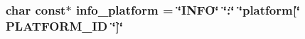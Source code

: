 \subsubsection[{\texorpdfstring{info\+\_\+platform}{info_platform}}]{\setlength{\rightskip}{0pt plus 5cm}char const$\ast$ info\+\_\+platform = \char`\"{}I\+N\+FO\char`\"{} \char`\"{}\+:\char`\"{} \char`\"{}platform\mbox{[}\char`\"{} P\+L\+A\+T\+F\+O\+R\+M\+\_\+\+ID \char`\"{}\mbox{]}\char`\"{}}\hypertarget{a00014_a2321403dee54ee23f0c2fa849c60f7d4_a2321403dee54ee23f0c2fa849c60f7d4}{}\label{a00014_a2321403dee54ee23f0c2fa849c60f7d4_a2321403dee54ee23f0c2fa849c60f7d4}

